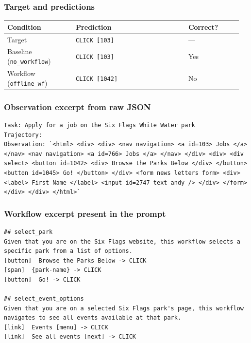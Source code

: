 \subsubsection{Target and
predictions}

{\def\LTcaptype{} %
\begin{longtable}[]{@{}>{\raggedright\arraybackslash}p{0.28\linewidth}>{\raggedright\arraybackslash}p{0.46\linewidth}>{\raggedright\arraybackslash}p{0.22\linewidth}@{}}
\toprule\noalign{}
Condition & Prediction & Correct? \\
\midrule\noalign{}
\endhead
\bottomrule\noalign{}
\endlastfoot
Target & \texttt{CLICK\ {[}103{]}} & --- \\
Baseline (\texttt{no\_workflow}) & \texttt{CLICK\ {[}103{]}} & Yes \\
Workflow (\texttt{offline\_wf}) & \texttt{CLICK\ {[}1042{]}} & No \\
\end{longtable}
}

\subsubsection{Observation excerpt from raw
JSON}

\begin{verbatim}
Task: Apply for a job on the Six Flags White Water park
Trajectory:
Observation: `<html> <div> <div> <nav navigation> <a id=103> Jobs </a> </nav> <nav navigation> <a id=766> Jobs </a> </nav> </div> <div> <div select> <button id=1042> <div> Browse the Parks Below </div> </button> <button id=1045> Go! </button> </div> <form news letters form> <div> <label> First Name </label> <input id=2747 text andy /> </div> </form> </div> </div> </html>`
\end{verbatim}

\subsubsection{Workflow excerpt present in the
prompt}

\begin{verbatim}
## select_park
Given that you are on the Six Flags website, this workflow selects a specific park from a list of options.
[button]  Browse the Parks Below -> CLICK
[span]  {park-name} -> CLICK
[button]  Go! -> CLICK

## select_event_options
Given that you are on a selected Six Flags park's page, this workflow navigates to see all events available at that park.
[link]  Events [menu] -> CLICK
[link]  See all events [next] -> CLICK
\end{verbatim}

